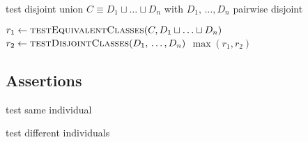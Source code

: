 \documentclass[paper.tex]{subfiles}
\begin{document}
\begin{algorithm}[H]
  \caption{test disjoint union $C \equiv D_1 \sqcup \ldots \sqcup D_n$ with $D_1, \,\ldots, D_n$ pairwise disjoint}
  \begin{algorithmic}[1]
    \raggedright
      \State $r_1 \gets \Call{testEquivalentClasses}{C, D_1 \sqcup \ldots \sqcup D_n}$
      \State $r_2 \gets \Call{testDisjointClasses}{D_1, \,\ldots, D_n}$
      \State \Return $\max(r_1, r_2)$
    \EndFunction
  \end{algorithmic}
\end{algorithm}


\subsection{Assertions}
\label{sec:algorithms:assert}


\begin{algorithm}[H]
  \caption{test same individual}
  \begin{algorithmic}[1]
    \raggedright
      \State \todo
    \EndFunction
  \end{algorithmic}
\end{algorithm}

\begin{algorithm}[H]
  \caption{test different individuals}
  \begin{algorithmic}[1]
    \raggedright
      \State \todo
    \EndFunction
  \end{algorithmic}
\end{algorithm}
\end{document}
